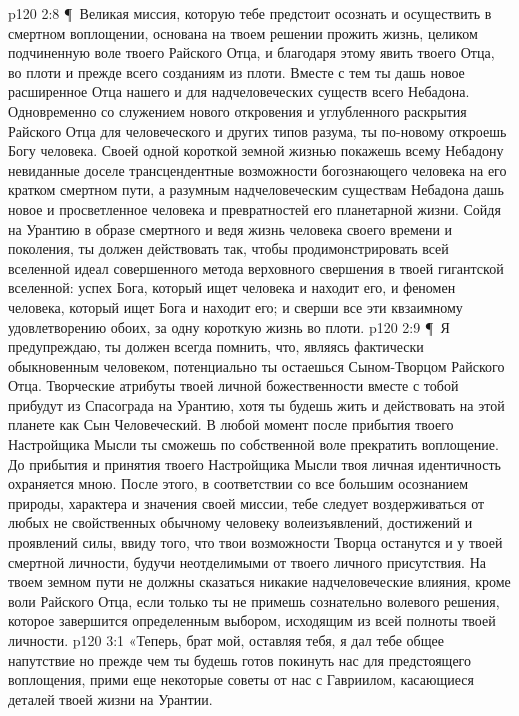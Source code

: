 \vs p120 2:8 \P\ \bibnobreakspace Великая миссия, которую тебе предстоит осознать и осуществить в смертном воплощении, основана на твоем решении прожить жизнь, целиком подчиненную воле твоего Райского Отца, и благодаря этому явить  твоего Отца, во плоти и прежде всего созданиям из плоти. Вместе с тем ты дашь новое расширенное  Отца нашего и для надчеловеческих существ всего Небадона. Одновременно со служением нового откровения и углубленного раскрытия Райского Отца для человеческого и других типов разума, ты по\hyp{}новому откроешь Богу человека. Своей одной короткой земной жизнью покажешь всему Небадону невиданные доселе трансцендентные возможности богознающего человека на его кратком смертном пути, а разумным надчеловеческим существам Небадона дашь новое и просветленное  человека и превратностей его планетарной жизни. Сойдя на Урантию в образе смертного и ведя жизнь человека своего времени и поколения, ты должен действовать так, чтобы продимонстрировать всей вселенной идеал совершенного метода верховного свершения в твоей гигантской вселенной: успех Бога, который ищет человека и находит его, и феномен человека, который ищет Бога и находит его; и сверши все эти квзаимному удовлетворению обоих, за одну короткую жизнь во плоти.
\vs p120 2:9 \P\ \bibnobreakspace Я предупреждаю, ты должен всегда помнить, что, являясь фактически обыкновенным человеком, потенциально ты остаешься Сыном\hyp{}Творцом Райского Отца. Творческие атрибуты твоей личной божественности вместе с тобой прибудут из Спасограда на Урантию, хотя ты будешь жить и действовать на этой планете как Сын Человеческий. В любой момент после прибытия твоего Настройщика Мысли ты сможешь по собственной воле прекратить воплощение. До прибытия и принятия твоего Настройщика Мысли твоя личная идентичность охраняется мною. После этого, в соответствии со все большим осознанием природы, характера и значения своей миссии, тебе следует воздерживаться от любых не свойственных обычному человеку волеизъявлений, достижений и проявлений силы, ввиду того, что твои возможности Творца останутся и у твоей смертной личности, будучи неотделимыми от твоего личного присутствия. На твоем земном пути не должны сказаться никакие надчеловеческие влияния, кроме воли Райского Отца, если только ты не примешь сознательно волевого решения, которое завершится определенным выбором, исходящим из всей полноты твоей личности.
\vs p120 3:1 «Теперь, брат мой, оставляя тебя, я дал тебе общее напутствие но прежде чем ты будешь готов покинуть нас для предстоящего воплощения, прими еще некоторые советы от нас с Гавриилом, касающиеся деталей твоей жизни на Урантии.

